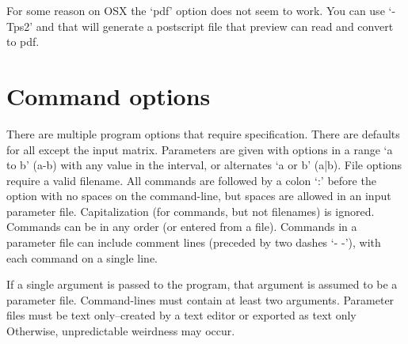 \documentclass[11pt]{memoir}
\begin{document}
	For some reason on OSX the `pdf' option does not seem to work.  You can use `-Tps2' and that will generate a postscript file that preview can read and convert to pdf.
	
	\section{Command options}
	There are multiple program options that require specification.  There are defaults for all except the input matrix.  
	Parameters are given with options in a range `a to b' (a-b) with any value in the interval, or alternates `a or b' (a|b). File options require a valid filename.
	All commands are followed by a colon `:' before the option with no spaces on the command-line, but spaces are allowed in an input parameter file.  Capitalization (for commands, but not filenames) is ignored.  Commands can be in any order (or entered from a file).  Commands in a 
	parameter file can include comment lines (preceded by two dashes `- -'), with each command on a single line.
	
	If a single argument is passed to the program, that argument is assumed to be a parameter file.  Command-lines must contain at least two 
	arguments.  Parameter files must be text only--created by a text editor or exported as text only Otherwise, unpredictable weirdness may occur.
\end{document}
